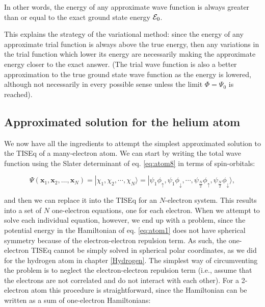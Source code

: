 \documentclass[
  9pt,
]{extbook}
\theoremstyle{definition}
\theoremstyle{definition}
\theoremstyle{definition}
\theoremstyle{remark}
\begin{document}
In other words, the energy of any approximate wave function is always greater than or equal to the exact ground state energy \({\cal E}_0\).

This explains the strategy of the variational method: since the energy of any approximate trial function is always above the true energy, then any variations in the trial function which lower its energy are necessarily making the approximate energy closer to the exact answer. (The trial wave function is also a better approximation to the true ground state wave function as the energy is lowered, although not necessarily in every possible sense unless the limit \(\Phi = \Psi_0\) is reached).

\hypertarget{approximated-solution-for-the-helium-atom}{%
\subsection{Approximated solution for the helium atom}\label{approximated-solution-for-the-helium-atom}}

We now have all the ingredients to attempt the simplest approximated solution to the TISEq of a many-electron atom. We can start by writing the total wave function using the Slater determinant of eq. \eqref{eq:atom8} in terms of spin-orbitals:

\begin{equation}
\Psi (\mathbf{x}_{1},\mathbf{x}_{2},\ldots ,\mathbf{x}_{N})= |\chi_{1},\chi_{2},\cdots ,\chi_{N}\rangle = |\psi_{1}\phi_{\uparrow},\psi_{1}\phi_{\downarrow},\cdots ,\psi_{\frac{N}{2}}\phi_{\uparrow},\psi_{\frac{N}{2}}\phi_{\downarrow}\rangle,
\label{eq:hf1}
\end{equation}

and then we can replace it into the TISEq for an \(N\)-electron system. This results into a set of \(N\) one-electron equations, one for each electron. When we attempt to solve each individual equation, however, we end up with a problem, since the potential energy in the Hamiltonian of eq. \eqref{eq:atom1} does not have spherical symmetry because of the electron-electron repulsion term. As such, the one-electron TISEq cannot be simply solved in spherical polar coordinates, as we did for the hydrogen atom in chapter \ref{Hydrogen}. The simplest way of circumventing the problem is to neglect the electron-electron repulsion term (i.e., assume that the electrons are not correlated and do not interact with each other). For a 2-electron atom this procedure is straightforward, since the Hamiltonian can be written as a sum of one-electron Hamiltonians:
\end{document}
